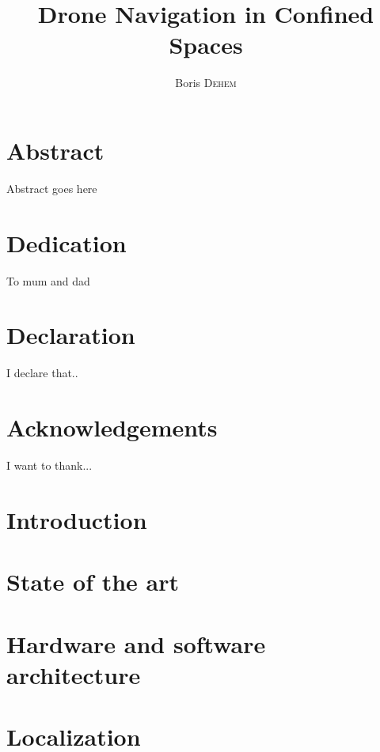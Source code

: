 \documentclass{eplmastersthesis}
\title{Drone Navigation in Confined Spaces}
\author{Boris \textsc{Dehem}}
\begin{document}

\maketitle					%
\thispagestyle{empty}		%


\chapter*{Abstract}
Abstract goes here

\chapter*{Dedication}
To mum and dad

\chapter*{Declaration}
I declare that..

\chapter*{Acknowledgements}
I want to thank...

\tableofcontents

\printglossaries

\chapter{Introduction}


\chapter{State of the art}


\chapter{Hardware and software architecture}


\chapter{Localization}

\end{document}
